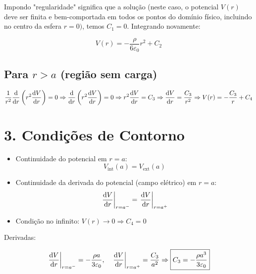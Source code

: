 \documentclass[a4paper,12pt]{article}
\begin{document}
\begin{flushleft}
Impondo "regularidade" significa que a solução (neste caso, 
o potencial \( V(r) \) deve ser finita e bem-comportada em todos os pontos 
do domínio físico, incluindo no centro da esfera \( r=0) \), temos \( C_1 = 0 \). Integrando novamente:

\begin{equation}
V(r) = -\frac{\rho}{6\varepsilon_0} r^2 + C_2
\end{equation}

\subsection*{\colorbox{red!15}{Para \( r > a \) (região sem carga)}}

\begin{equation}
\frac{1}{r^2} \dv{r} \left( r^2 \dv{V}{r} \right) = 0
\Rightarrow \dv{r} \left( r^2 \dv{V}{r} \right) = 0
\Rightarrow r^2 \dv{V}{r} = C_3
\Rightarrow \dv{V}{r} = \frac{C_3}{r^2}
\Rightarrow V(r) = -\frac{C_3}{r} + C_4
\end{equation}

\section*{3. Condições de Contorno}

\begin{itemize}
    \item \colorbox{green!15}{Continuidade do potencial em \( r = a \)}:
    \begin{equation}
    V_{\text{int}}(a) = V_{\text{ext}}(a)
    \end{equation}
    \item \colorbox{green!15}{Continuidade da derivada do potencial (campo elétrico) em \( r = a \)}:
    \begin{equation}
    \left. \dv{V}{r} \right|_{r=a^-} = \left. \dv{V}{r} \right|_{r=a^+}
    \end{equation}
    \item \colorbox{green!15}{Condição no infinito: \( V(r) \rightarrow 0 \Rightarrow C_4 = 0 \)}
\end{itemize}

Derivadas:

\begin{equation}
\left. \dv{V}{r} \right|_{r=a^-} = -\frac{\rho a}{3\varepsilon_0}, \quad
\left. \dv{V}{r} \right|_{r=a^+} = \frac{C_3}{a^2}
\Rightarrow \boxed{C_3 = -\frac{\rho a^3}{3\varepsilon_0}}
\end{equation}


\end{flushleft}
\end{document}
